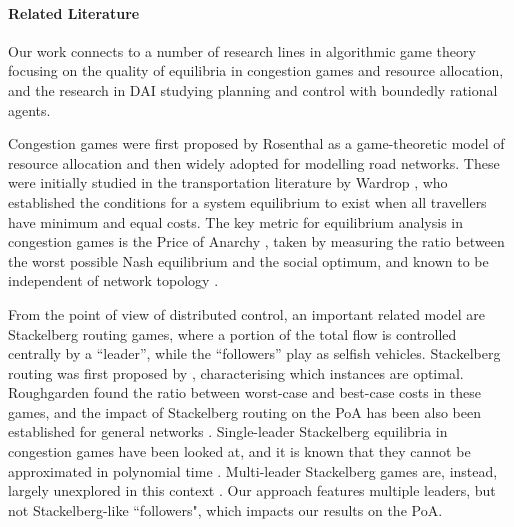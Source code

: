 \documentclass{article}
\begin{document}
\paragraph{Related Literature} 
  Our work connects to a number of research lines in algorithmic game theory focusing on the quality of equilibria in congestion games and resource allocation, and the research in DAI studying planning and control with boundedly rational agents.

  Congestion games were first proposed by Rosenthal as a game-theoretic model of resource allocation \cite{Rosenthal} and then widely adopted for modelling road networks. These were initially studied in the transportation literature by Wardrop \cite{Wardrop}, who established the conditions for a system equilibrium to exist when all travellers have minimum and equal costs. The key metric for equilibrium analysis in congestion games is the Price of Anarchy \cite{Koutsoupias2009}, taken by measuring the ratio between the worst possible Nash equilibrium and the social optimum, and known to be independent of network topology \cite{Roughgarden2003}. 

  From the point of view of distributed control, an important related model are Stackelberg routing games, where a portion of the total flow is controlled centrally by a ``leader'', while the ``followers'' play as selfish vehicles. Stackelberg routing was first proposed by \cite{Korilis1997}, characterising which instances are optimal. Roughgarden \cite{Roughgarden2004} found the ratio between worst-case and best-case costs in these games, and the impact of Stackelberg routing on the PoA has been also been established for general networks \cite{Bonifaci2010}. Single-leader Stackelberg equilibria in congestion games have been looked at, and it is known that they cannot be approximated in polynomial time \cite{Castiglioni2019}. Multi-leader Stackelberg games are, instead, largely unexplored in this context \cite{Castiglioni2019a}. Our approach features multiple leaders, but not Stackelberg-like ``followers", which impacts our results on the PoA.
\end{document}
